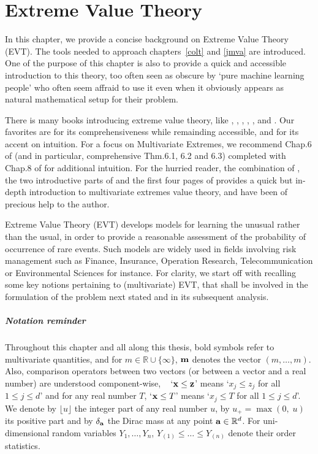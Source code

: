 \chapter{Extreme Value Theory}
\label{back:EVT}
\begin{chapabstract}
In this chapter, we provide a concise background on Extreme Value Theory (EVT). The tools needed to approach chapters~\ref{colt} and \ref{jmva} are introduced. One of the purpose of this chapter is also to provide a quick and accessible introduction to this theory, too often seen as obscure by `pure machine learning people' who often seem affraid to use it even when it obviously appears as natural mathematical setup for their problem.
\end{chapabstract}

There is many books introducing extreme value theory, like \cite{Leadbetter1983}, \cite{Resnick1987},  \cite{Coles2001}, \cite{BGTS04}, \cite{dHF06}, and \cite{Resnick2007}. Our favorites are \cite{Resnick2007} for its comprehensiveness while remainding accessible, and \cite{Coles2001} for its accent on intuition. For a focus on Multivariate Extremes, we recommend Chap.6 of \cite{Resnick2007} (and in particular, comprehensive Thm.6.1, 6.2 and 6.3) completed with Chap.8 of \cite{Coles2001} for additional intuition.
%
For the hurried reader, the combination of
\cite{Segers12}, the two introductive parts of \cite{Einmahl2012} and the first four pages of  \cite{coles1991modeling} provides a quick but in-depth introduction to multivariate extremes value theory, and have been of precious help to the author.

Extreme Value Theory (\textsc{EVT}) develops models for learning the
unusual rather than the usual, in order to provide a reasonable
assessment of the probability of occurrence of rare events. Such models are widely used in fields
involving risk management such as Finance, Insurance, Operation Research, Telecommunication
or Environmental Sciences for instance. For clarity, we start off with recalling some key notions pertaining to (multivariate) \textsc{EVT}, that shall be involved in the formulation of the problem next stated and in its subsequent analysis. 

\paragraph{Notation reminder}
Throughout this chapter and all along this thesis, bold symbols refer to multivariate quantities, and for $m \in \mathbb{R}\cup \{\infty\}$, $\mathbf m$ denotes the vector $(m,\ldots,m)$.
Also, comparison operators  between two vectors (or between a vector and a real number) are
understood component-wise, \ie~ `$\mathbf x \le \mathbf z$' means `$x_j \le z_j$
for all $1\le j\le d$' and  for any real number $T$,  `$\mathbf x\le T$' means `$x_j \le T$ for all $1\le j\le d$'. 
We denote by $\lfloor u \rfloor$ the integer part of any real number $u$, by $u_+=\max(0,\; u)$ its positive part and by $\delta_{\mathbf a}$ the Dirac mass at any point $\mathbf a\in \mathbb{R}^d$.  
For uni-dimensional random variables $Y_1,\ldots,Y_n$, $Y_{(1)} \le \ldots\le Y_{(n)}$ denote their order statistics.

